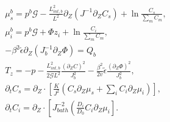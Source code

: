 \begin{gather}
\mu^{b}_s = p^b \mathcal{G} - \frac{L^2_{int,b}}{L^2}  \partial_Z (J^{-1} \partial_Z C_s) + \ln \frac{C_s}{\sum_m C_m}, \\
\mu^{b}_i = p^b \mathcal{G}+ \Phi z_i + \ln \frac{C_i}{\sum_m C_m} ,\\
-\beta^2 \tilde{\epsilon} \partial_Z (J_b^{-1}\partial_Z\Phi) = Q_b\, \\[2.5mm]
T_z= -p - \frac{L^2_{int,b}}{2\mathcal{G}L^2} \frac{(\partial_Z C)^2}{J_{b}^2}-\frac{\beta^2}{2v}\tilde{\epsilon} \frac{(\partial_Z \Phi)^2}{J_b^2},\\
\partial_t C_s=\partial_Z \cdot\left[\frac{K}{J^2} \left(C_s\partial_Z \mu_s +\sum_i  C_i \partial_Z \mu_i\right)\right],\\
\partial_t C_i= \partial_Z \cdot\left[ J_{bath}^{-2} \left(\frac{D_i}{D_0}C_i\partial_Z \mu_i\right].
\end{gather}